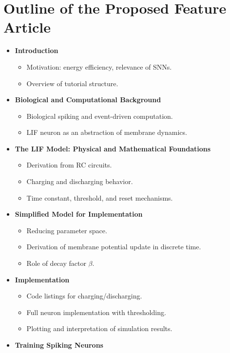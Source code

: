 \documentclass[journal,onecolumn]{IEEEtran}
\begin{document}
	\section{Outline of the Proposed Feature Article}
		\begin{itemize}
			\item \textbf{Introduction}
			\begin{itemize}
				\item Motivation: energy efficiency, relevance of SNNs.
				\item Overview of tutorial structure.
			\end{itemize}
			\item \textbf{Biological and Computational Background}
			\begin{itemize}
				\item Biological spiking and event-driven computation.
				\item LIF neuron as an abstraction of membrane dynamics.
			\end{itemize}
			\item \textbf{The LIF Model: Physical and Mathematical Foundations}
			\begin{itemize}
				\item Derivation from RC circuits.
				\item Charging and discharging behavior.
				\item Time constant, threshold, and reset mechanisms.
			\end{itemize}
			\item \textbf{Simplified Model for Implementation}
			\begin{itemize}
				\item Reducing parameter space.
				\item Derivation of membrane potential update in discrete time.
				\item Role of decay factor $\beta$.
			\end{itemize}
			\item \textbf{Implementation}
			\begin{itemize}
				\item Code listings for charging/discharging.
				\item Full neuron implementation with thresholding.
				\item Plotting and interpretation of simulation results.
			\end{itemize}
			\item \textbf{Training Spiking Neurons}
			\begin{itemize}

\end{itemize}
\end{itemize}
\end{document}
